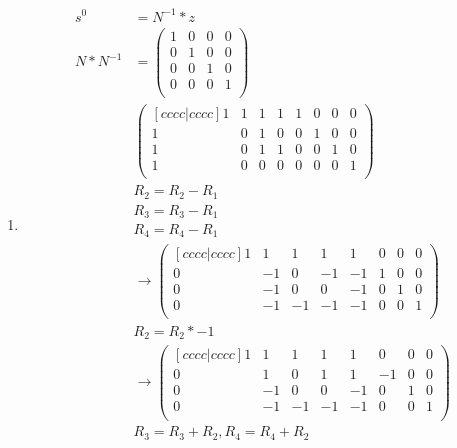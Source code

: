 \documentclass[12pt,a4paper,final,onecolumn,oneside]{article}
\begin{document}
\begin{enumerate}[label=(\alph*)]
    \item
    \begin{equation*}
    \begin{aligned}
    s^0 &= N^{-1} * z \\
    N * N^{-1} &=
        \begin{pmatrix}
        1 & 0 & 0 & 0 \\
        0 & 1 & 0 & 0 \\
        0 & 0 & 1 & 0 \\
        0 & 0 & 0 & 1 \\
        \end{pmatrix} \\
    &
    \begin{pmatrix}[cccc|cccc]
        1 & 1 & 1 & 1   &   1 & 0 & 0 & 0 \\
        1 & 0 & 1 & 0   &   0 & 1 & 0 & 0 \\
        1 & 0 & 1 & 1   &   0 & 0 & 1 & 0 \\
        1 & 0 & 0 & 0   &   0 & 0 & 0 & 1 \\
    \end{pmatrix} \\
    &R_2 = R_2 - R_1 \\ &R_3 = R_3 - R_1 \\ &R_4 = R_4 - R_1 \\
    &\xrightarrow[]{}
    \begin{pmatrix}[cccc|cccc]
        1 & 1 & 1 & 1    &   1 & 0 & 0 & 0 \\
        0 & -1 & 0 & -1  &   -1 & 1 & 0 & 0 \\
        0 & -1 & 0 & 0   &   -1 & 0 & 1 & 0 \\
        0 & -1 & -1 & -1 &   -1 & 0 & 0 & 1 \\
    \end{pmatrix} \\
    &R_2 = R_2 * -1 \\
    &\xrightarrow[]{}
    \begin{pmatrix}[cccc|cccc]
        1 & 1 & 1 & 1    &   1 & 0 & 0 & 0 \\
        0 & 1 & 0 & 1    &   1 & -1 & 0 & 0 \\
        0 & -1 & 0 & 0   &   -1 & 0 & 1 & 0 \\
        0 & -1 & -1 & -1 &   -1 & 0 & 0 & 1 \\
    \end{pmatrix} \\
    &R_3 = R_3 + R_2, R_4 = R_4 + R_2 \\

\end{aligned}
\end{equation*}
\end{enumerate}
\end{document}
